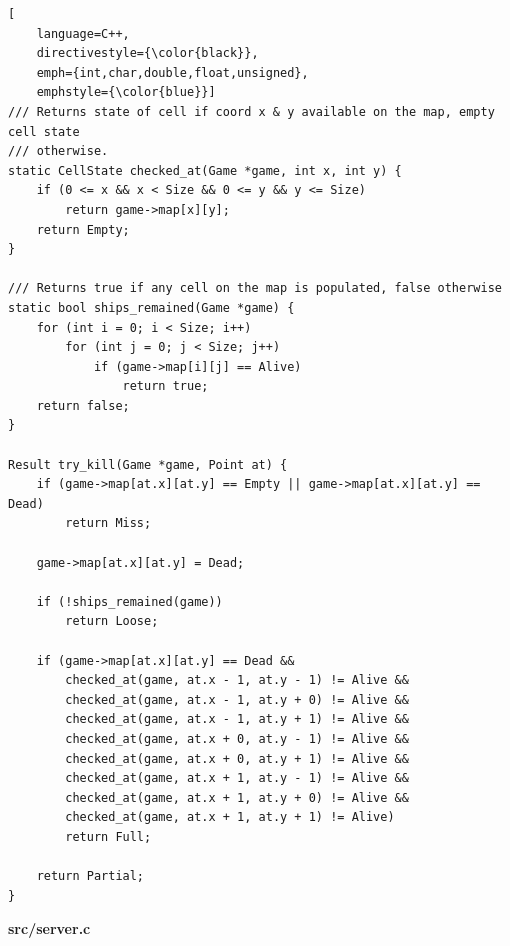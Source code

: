 \begin{lstlisting}[
    language=C++,
    directivestyle={\color{black}}, 
    emph={int,char,double,float,unsigned}, 
    emphstyle={\color{blue}}]
/// Returns state of cell if coord x & y available on the map, empty cell state
/// otherwise.
static CellState checked_at(Game *game, int x, int y) {
    if (0 <= x && x < Size && 0 <= y && y <= Size)
        return game->map[x][y];
    return Empty;
}

/// Returns true if any cell on the map is populated, false otherwise
static bool ships_remained(Game *game) {
    for (int i = 0; i < Size; i++)
        for (int j = 0; j < Size; j++)
            if (game->map[i][j] == Alive)
                return true;
    return false;
}

Result try_kill(Game *game, Point at) {
    if (game->map[at.x][at.y] == Empty || game->map[at.x][at.y] == Dead)
        return Miss;

    game->map[at.x][at.y] = Dead;

    if (!ships_remained(game))
        return Loose;

    if (game->map[at.x][at.y] == Dead &&
        checked_at(game, at.x - 1, at.y - 1) != Alive &&
        checked_at(game, at.x - 1, at.y + 0) != Alive &&
        checked_at(game, at.x - 1, at.y + 1) != Alive &&
        checked_at(game, at.x + 0, at.y - 1) != Alive &&
        checked_at(game, at.x + 0, at.y + 1) != Alive &&
        checked_at(game, at.x + 1, at.y - 1) != Alive &&
        checked_at(game, at.x + 1, at.y + 0) != Alive &&
        checked_at(game, at.x + 1, at.y + 1) != Alive)
        return Full;

    return Partial;
}
\end{lstlisting}

\textbf{src/server.c}

